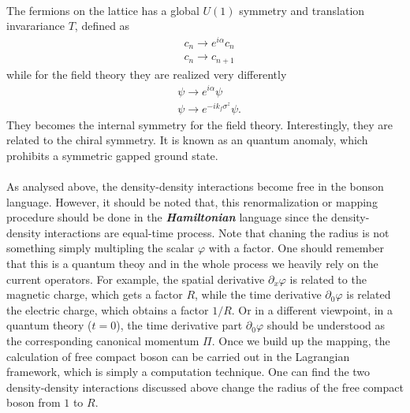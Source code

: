  \\
The fermions on the lattice has a global $U(1)$ symmetry and translation invarariance $T$, defined as
\begin{equation}
	\begin{aligned}
		&c_n \rightarrow e^{i\alpha} c_n \\
		&c_n \rightarrow c_{n+1}
	\end{aligned}
\end{equation} 
while for the field theory they are realized very differently
\begin{equation}
	\begin{aligned}
		&\psi \rightarrow e^{i\alpha} \psi \\
		&\psi \rightarrow e^{-i k_f \sigma^z}\psi.
	\end{aligned}
\end{equation} 
They becomes the internal symmetry for the field theory. Interestingly, they are related to the chiral symmetry. It is known as an quantum anomaly, which prohibits a symmetric gapped ground state.  \\


 \\
As analysed above, the density-density interactions become free in the bonson language.
However, it should be noted that, this renormalization or mapping procedure should be 
done in the \textbf{\textit{Hamiltonian}} language since the density-density
interactions are equal-time process. Note that chaning the radius is not something
simply multipling the scalar $\varphi$ with a factor. One should remember that this is
a quantum theoy and in the whole process we heavily rely on the current operators. For 
example, the spatial derivative $\partial_x \varphi$ is related to the magnetic charge, 
which gets a factor $R$, while the time derivative $\partial_0\varphi$ is related the 
electric charge, which obtains a factor $1/R$. Or in a different viewpoint, in a 
quantum theory ($t=0$), the time derivative part $\partial_0\varphi$ should be 
understood as the corresponding canonical momentum $\Pi$. Once we build up the 
mapping, the calculation of free compact boson can be carried out in the Lagrangian 
framework, which is simply a computation technique. One can find the two 
density-density interactions discussed above change the radius of the free compact 
boson from $1$ to $R$. 

